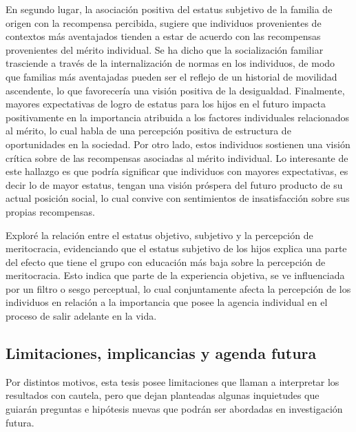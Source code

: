 \documentclass[12pt]{article}
\begin{document}
En segundo lugar, la asociación positiva del estatus subjetivo de la familia de origen con la recompensa percibida, sugiere que individuos provenientes de contextos más aventajados tienden a estar de acuerdo con las recompensas provenientes del mérito individual. Se ha dicho que la socialización familiar trasciende a través de la internalización de normas en los individuos, de modo que familias más aventajadas pueden ser el reflejo de un historial de movilidad ascendente, lo que favorecería una visión positiva de la desigualdad. Finalmente, mayores expectativas de logro de estatus para los hijos en el futuro impacta positivamente en la importancia atribuida a los factores individuales relacionados al mérito, lo cual habla de una percepción positiva de estructura de oportunidades en la sociedad. Por otro lado, estos individuos sostienen una visión crítica sobre de las recompensas asociadas al mérito individual. Lo interesante de este hallazgo es que podría significar que individuos con mayores expectativas, es decir lo de mayor estatus, tengan una visión próspera del futuro producto de su actual posición social, lo cual convive con sentimientos de insatisfacción sobre sus propias recompensas.   

Exploré la relación entre el estatus objetivo, subjetivo y la percepción de meritocracia, evidenciando que el estatus subjetivo de los hijos explica una parte del efecto que tiene el grupo con educación más baja sobre la percepción de meritocracia. Esto indica que parte de la experiencia objetiva, se ve influenciada por un filtro o sesgo perceptual, lo cual conjuntamente afecta la percepción de los individuos en relación a la importancia que posee la agencia individual en el proceso de salir adelante en la vida.    

%

\newpage
         
\subsection*{Limitaciones, implicancias y agenda futura}	

Por distintos motivos, esta tesis posee limitaciones que llaman a interpretar los resultados con cautela, pero que dejan planteadas algunas inquietudes que guiarán preguntas e hipótesis nuevas que podrán ser abordadas en investigación futura.
\end{document}
